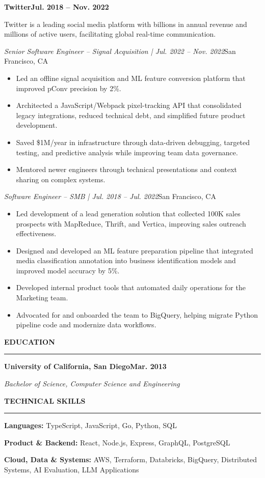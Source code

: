 \documentclass[10pt,letterpaper]{article}
\newcommand{\resumesection}[1]{
  \vspace{10pt}
  {\normalsize\bfseries\MakeUppercase{#1}\par}
  \vspace{3pt}
  \hrule
  \vspace{7pt}
}
\newcommand{\companyheading}[2]{
  \noindent\textbf{#1}\hfill\textbf{#2}\par
}
\newcommand{\roleheading}[2]{
  \noindent\textit{#1}\hfill #2\par
}
\newcommand{\companysummary}[1]{
  {\small #1\par}
  \vspace{2pt}
}
\newcommand{\entryspace}{
  \vspace{6pt}
}
\begin{document}
\companyheading{Twitter}{Jul. 2018 -- Nov. 2022}
\companysummary{Twitter is a leading social media platform with billions in annual revenue and millions of active users, facilitating global real-time communication.}

\roleheading{Senior Software Engineer -- Signal Acquisition | Jul. 2022 -- Nov. 2022}{San Francisco, CA}
\begin{itemize}\small
  \item Led an offline signal acquisition and ML feature conversion platform that improved pConv precision by 2\%.
  \item Architected a JavaScript/Webpack pixel-tracking API that consolidated legacy integrations, reduced technical debt, and simplified future product development.
  \item Saved \$1M/year in infrastructure through data-driven debugging, targeted testing, and predictive analysis while improving team data governance.
  \item Mentored newer engineers through technical presentations and context sharing on complex systems.
\end{itemize}
\entryspace
\normalsize

\roleheading{Software Engineer -- SMB | Jul. 2018 -- Jul. 2022}{San Francisco, CA}
\begin{itemize}\small
  \item Led development of a lead generation solution that collected 100K sales prospects with MapReduce, Thrift, and Vertica, improving sales outreach effectiveness.
  \item Designed and developed an ML feature preparation pipeline that integrated media classification annotation into business identification models and improved model accuracy by 5\%.
  \item Developed internal product tools that automated daily operations for the Marketing team.
  \item Advocated for and onboarded the team to BigQuery, helping migrate Python pipeline code and modernize data workflows.
\end{itemize}
\entryspace
\normalsize

\resumesection{Education}
\companyheading{University of California, San Diego}{Mar. 2013}
\textit{Bachelor of Science, Computer Science and Engineering}\par

\resumesection{Technical Skills}
{\small
\textbf{Languages:} TypeScript, JavaScript, Go, Python, SQL \par
\textbf{Product \& Backend:} React, Node.js, Express, GraphQL, PostgreSQL \par
\textbf{Cloud, Data \& Systems:} AWS, Terraform, Databricks, BigQuery, Distributed Systems, AI Evaluation, LLM Applications \par
}
\end{document}
